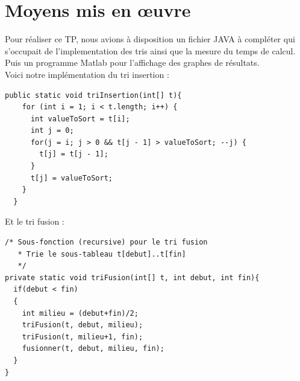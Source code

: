 \documentclass{article}
\begin{document}
\section{Moyens mis en \oe uvre}
Pour réaliser ce TP, nous avions à disposition un fichier JAVA à compléter qui s'occupait de l'implementation des tris ainsi que la mesure du temps de calcul. Puis un programme Matlab pour l'affichage des graphes de résultats.\\
Voici notre implémentation du tri insertion :\\
\begin{verbatim}
public static void triInsertion(int[] t){
    for (int i = 1; i < t.length; i++) {
      int valueToSort = t[i];
      int j = 0;
      for(j = i; j > 0 && t[j - 1] > valueToSort; --j) {
        t[j] = t[j - 1];
      }
      t[j] = valueToSort;
    }
  }
\end{verbatim}
Et le tri fusion :
\begin{verbatim}
/* Sous-fonction (recursive) pour le tri fusion
   * Trie le sous-tableau t[debut]..t[fin]
   */
private static void triFusion(int[] t, int debut, int fin){
  if(debut < fin)
  {
    int milieu = (debut+fin)/2;
    triFusion(t, debut, milieu);
    triFusion(t, milieu+1, fin);
    fusionner(t, debut, milieu, fin);
  }
}
\end{verbatim}
\end{document}
